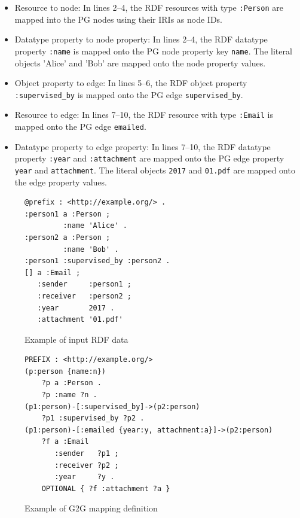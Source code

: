 \documentclass[runningheads]{llncs}
\begin{document}
\begin{itemize}
    \item Resource to node: In lines 2--4, the RDF resources with type \texttt{:Person} are mapped into the PG nodes using their IRIs as node IDs.
    \item Datatype property to node property: In lines 2--4, the RDF datatype property \texttt{:name} is mapped onto the PG node property key \texttt{name}. The literal objects 'Alice' and 'Bob' are mapped onto the node property values.
    \item Object property to edge: In lines 5--6, the RDF object property \texttt{:supervised\_by} is mapped onto the PG edge \texttt{supervised\_by}.
    \item Resource to edge: In lines 7--10, the RDF resource with type \texttt{:Email} is mapped onto the PG edge \texttt{emailed}. 
    \item Datatype property to edge property: In lines 7--10, the RDF datatype property \texttt{:year} and \texttt{:attachment} are mapped onto the PG edge property \texttt{year} and \texttt{attachment}. The literal objects \texttt{2017} and \texttt{01.pdf} are mapped onto the edge property values.
\end{itemize}


\begin{figure}[!t]
\begin{scriptsize}
\begin{verbatim}
@prefix : <http://example.org/> .
:person1 a :Person ;
         :name 'Alice' .
:person2 a :Person ;
         :name 'Bob' .
:person1 :supervised_by :person2 .
[] a :Email ;
   :sender     :person1 ;
   :receiver   :person2 ;
   :year       2017 .
   :attachment '01.pdf'
\end{verbatim}
\end{scriptsize}
\caption{Example of input RDF data}
\label{fig:example-rdf}
\end{figure}


\begin{figure}[!t]
\begin{scriptsize}
\begin{verbatim}
PREFIX : <http://example.org/>
(p:person {name:n})
    ?p a :Person .
    ?p :name ?n .
(p1:person)-[:supervised_by]->(p2:person)
    ?p1 :supervised_by ?p2 .
(p1:person)-[:emailed {year:y, attachment:a}]->(p2:person)
    ?f a :Email
       :sender   ?p1 ;
       :receiver ?p2 ;
       :year     ?y .
    OPTIONAL { ?f :attachment ?a }
\end{verbatim}
\end{scriptsize}
\caption{Example of G2G mapping definition}
\label{fig:example-g2g}
\end{figure}
\end{document}
